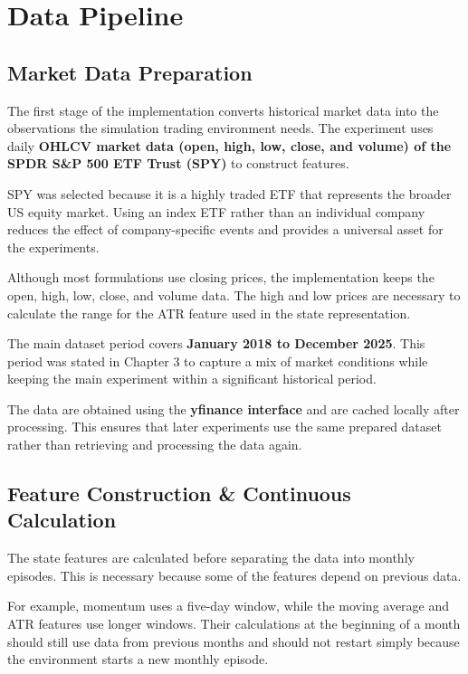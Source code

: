 \section{Data Pipeline}

\subsection{Market Data Preparation}

The first stage of the implementation converts historical market data
into the observations the simulation trading environment needs. The
experiment uses daily \textbf{OHLCV market data (open, high, low, close,
and volume) of the SPDR S\&P 500 ETF Trust (SPY)} to construct features.

SPY was selected because it is a highly traded ETF that represents the
broader US equity market. Using an index ETF rather than an individual
company reduces the effect of company-specific events and provides a
universal asset for the experiments.

Although most formulations use closing prices, the implementation keeps
the open, high, low, close, and volume data. The high and low prices are
necessary to calculate the range for the ATR feature used in the state
representation.

The main dataset period covers \textbf{January 2018 to December 2025}.
This period was stated in Chapter 3 to capture a mix of market
conditions while keeping the main experiment within a significant
historical period.

The data are obtained using the \textbf{yfinance interface} and are
cached locally after processing. This ensures that later experiments use
the same prepared dataset rather than retrieving and processing the data
again.

\subsection{Feature Construction \& Continuous Calculation}

The state features are calculated before separating the data into
monthly episodes. This is necessary because some of the features depend
on previous data.

For example, momentum uses a five-day window, while the moving average
and ATR features use longer windows. Their calculations at the beginning
of a month should still use data from previous months and should not
restart simply because the environment starts a new monthly episode.


